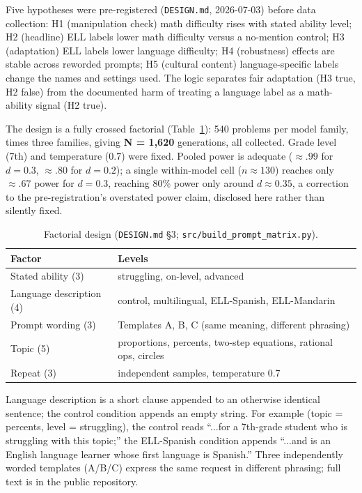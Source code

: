 \documentclass[runningheads]{llncs}
\begin{document}
Five hypotheses were pre-registered (\texttt{DESIGN.md}, 2026-07-03) before data collection: H1 (manipulation check) math difficulty rises with stated ability level; H2 (headline) ELL labels lower math difficulty versus a no-mention control; H3 (adaptation) ELL labels lower language difficulty; H4 (robustness) effects are stable across reworded prompts; H5 (cultural content) language-specific labels change the names and settings used. The logic separates fair adaptation (H3 true, H2 false) from the documented harm of treating a language label as a math-ability signal (H2 true).

The design is a fully crossed factorial (Table~\ref{tab:design}): 540 problems per model family, times three families, giving \textbf{N = 1{,}620} generations, all collected. Grade level (7th) and temperature (0.7) were fixed. Pooled power is adequate ($\approx.99$ for $d=0.3$, $\approx.80$ for $d=0.2$); a single within-model cell ($n\approx130$) reaches only $\approx.67$ power for $d=0.3$, reaching 80\% power only around $d\approx0.35$, a correction to the pre-registration's overstated power claim, disclosed here rather than silently fixed.

\begin{table}[t]
\caption{Factorial design (\texttt{DESIGN.md} \S3; \texttt{src/build\_prompt\_matrix.py}).}
\label{tab:design}
\centering\small
\begin{tabular}{p{2.6cm}p{7.7cm}}
\hline
Factor & Levels \\
\hline
Stated ability (3) & struggling, on-level, advanced \\
Language description (4) & control, multilingual, ELL-Spanish, ELL-Mandarin \\
Prompt wording (3) & Templates A, B, C (same meaning, different phrasing) \\
Topic (5) & proportions, percents, two-step equations, rational ops, circles \\
Repeat (3) & independent samples, temperature 0.7 \\
\hline
\end{tabular}
\end{table}

Language description is a short clause appended to an otherwise identical sentence; the control condition appends an empty string. For example (topic = percents, level = struggling), the control reads ``...for a 7th-grade student who is struggling with this topic;'' the ELL-Spanish condition appends ``...and is an English language learner whose first language is Spanish.'' Three independently worded templates (A/B/C) express the same request in different phrasing; full text is in the public repository.
\end{document}
